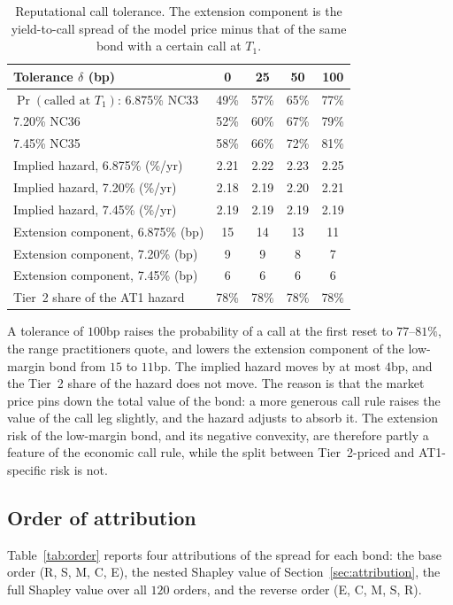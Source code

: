\begin{table}[H]
\centering
\begin{tabular}{lcccc}
\toprule
Tolerance $\delta$ (bp) & 0 & 25 & 50 & 100 \\
\midrule
$\Pr(\text{called at }T_1)$: 6.875\% NC33 & 49\% & 57\% & 65\% & 77\% \\
\phantom{$\Pr(\text{called at }T_1)$:} 7.20\% NC36 & 52\% & 60\% & 67\% & 79\% \\
\phantom{$\Pr(\text{called at }T_1)$:} 7.45\% NC35 & 58\% & 66\% & 72\% & 81\% \\
Implied hazard, 6.875\% (\%/yr) & 2.21 & 2.22 & 2.23 & 2.25 \\
Implied hazard, 7.20\% (\%/yr) & 2.18 & 2.19 & 2.20 & 2.21 \\
Implied hazard, 7.45\% (\%/yr) & 2.19 & 2.19 & 2.19 & 2.19 \\
Extension component, 6.875\% (bp) & 15 & 14 & 13 & 11 \\
Extension component, 7.20\% (bp) & 9 & 9 & 8 & 7 \\
Extension component, 7.45\% (bp) & 6 & 6 & 6 & 6 \\
Tier~2 share of the AT1 hazard & 78\% & 78\% & 78\% & 78\% \\
\bottomrule
\end{tabular}
\caption{Reputational call tolerance. The extension component is the yield-to-call spread of
the model price minus that of the same bond with a certain call at $T_1$.}
\label{tab:reputation}
\end{table}

A tolerance of $100$bp raises the probability of a call at the first reset to $77$--$81\%$,
the range practitioners quote, and lowers the extension component of the low-margin bond
from $15$ to $11$bp. The implied hazard moves by at most $4$bp, and the Tier~2 share of the
hazard does not move. The reason is that the market price pins down the total value of the
bond: a more generous call rule raises the value of the call leg slightly, and the hazard
adjusts to absorb it. The extension risk of the low-margin bond, and its negative convexity,
are therefore partly a feature of the economic call rule, while the split between Tier~2-priced
and AT1-specific risk is not.

\subsection{Order of attribution}

Table~\ref{tab:order} reports four attributions of the spread for each bond: the base order
(R, S, M, C, E), the nested Shapley value of Section~\ref{sec:attribution}, the full Shapley
value over all $120$ orders, and the reverse order (E, C, M, S, R).

